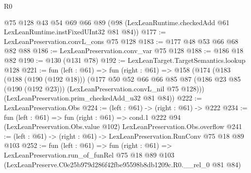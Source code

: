 \begin{lexlean}{R0}
\begin{coremodule}
    @75
    @128
    @43
    @54
    @69
    @66
    @89
    (@98 (LexLeanRuntime.checkedAdd @61 LexLeanRuntime.instFixedUInt32 @81 @84))
@177 := LexLeanPreservation.convL_cons @75 @128
@183 := @177 @48 @53 @66 @68 @82 @88
@186 := LexLeanPreservation.conv_var @75 @128
@188 := @186 @18 @82
@190 := @130 (@131 @78)
@192 := LexLeanTarget.TargetSemantics.lookup @128
@221 := fun (left : @61) =>
  fun (right : @61) =>
  @158
    (@174
      (@183
        (@188 (@190 (@192 @18)))
        (@177
          @50
          @52
          @66
          @66
          @85
          @87
          (@186 @23 @85 (@190 (@192 @23)))
          (LexLeanPreservation.convL_nil @75 @128)))
      (LexLeanPreservation.prim_checkedAdd_u32 @81 @84))
@222 := LexLeanPreservation.Obs
@224 := (left : @61) -> (right : @61) -> @222
@234 := fun (left : @61) =>
  fun (right : @61) =>
  cond.{1} @222 @94 (LexLeanPreservation.Obs.value @102) LexLeanPreservation.Obs.overflow
@241 := (left : @61) -> (right : @61) -> LexLeanPreservation.RunConv @75 @18 @89 @103
@252 := fun (left : @61) =>
  fun (right : @61) =>
  LexLeanPreservation.run_of_funRel
    @75
    @18
    @89
    @103
    (LexLeanPreserve.C0e25b979d286f42fbe95598b8db1209c.R0.__rel_0 @81 @84)
\end{coremodule}
\end{lexlean}
